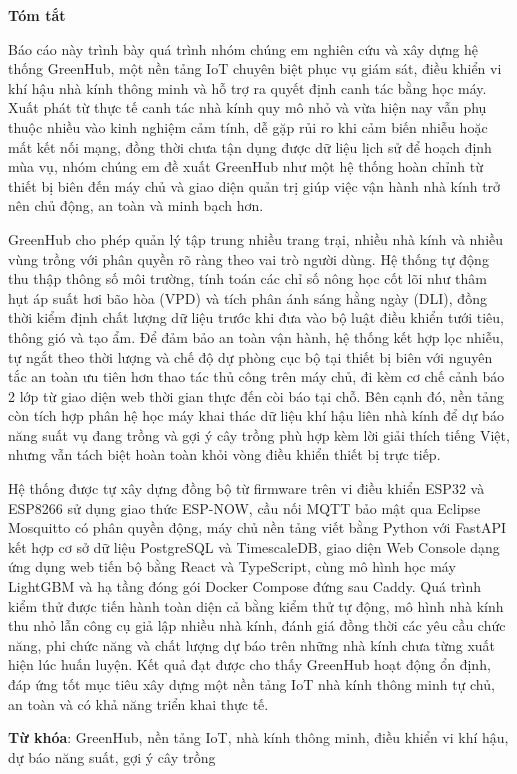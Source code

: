 \begin{center}
\textbf{\large{Tóm tắt}}
\end{center}


\begin{small}

Báo cáo này trình bày quá trình nhóm chúng em nghiên cứu và xây dựng hệ thống GreenHub, một nền tảng IoT chuyên biệt phục vụ giám sát, điều khiển vi khí hậu nhà kính thông minh và hỗ trợ ra quyết định canh tác bằng học máy. Xuất phát từ thực tế canh tác nhà kính quy mô nhỏ và vừa hiện nay vẫn phụ thuộc nhiều vào kinh nghiệm cảm tính, dễ gặp rủi ro khi cảm biến nhiễu hoặc mất kết nối mạng, đồng thời chưa tận dụng được dữ liệu lịch sử để hoạch định mùa vụ, nhóm chúng em đề xuất GreenHub như một hệ thống hoàn chỉnh từ thiết bị biên đến máy chủ và giao diện quản trị giúp việc vận hành nhà kính trở nên chủ động, an toàn và minh bạch hơn.

GreenHub cho phép quản lý tập trung nhiều trang trại, nhiều nhà kính và nhiều vùng trồng với phân quyền rõ ràng theo vai trò người dùng. Hệ thống tự động thu thập thông số môi trường, tính toán các chỉ số nông học cốt lõi như thâm hụt áp suất hơi bão hòa (VPD) và tích phân ánh sáng hằng ngày (DLI), đồng thời kiểm định chất lượng dữ liệu trước khi đưa vào bộ luật điều khiển tưới tiêu, thông gió và tạo ẩm. Để đảm bảo an toàn vận hành, hệ thống kết hợp lọc nhiễu, tự ngắt theo thời lượng và chế độ dự phòng cục bộ tại thiết bị biên với nguyên tắc an toàn ưu tiên hơn thao tác thủ công trên máy chủ, đi kèm cơ chế cảnh báo 2 lớp từ giao diện web thời gian thực đến còi báo tại chỗ. Bên cạnh đó, nền tảng còn tích hợp phân hệ học máy khai thác dữ liệu khí hậu liên nhà kính để dự báo năng suất vụ đang trồng và gợi ý cây trồng phù hợp kèm lời giải thích tiếng Việt, nhưng vẫn tách biệt hoàn toàn khỏi vòng điều khiển thiết bị trực tiếp.

Hệ thống được tự xây dựng đồng bộ từ firmware trên vi điều khiển ESP32 và ESP8266 sử dụng giao thức ESP-NOW, cầu nối MQTT bảo mật qua Eclipse Mosquitto có phân quyền động, máy chủ nền tảng viết bằng Python với FastAPI kết hợp cơ sở dữ liệu PostgreSQL và TimescaleDB, giao diện Web Console dạng ứng dụng web tiến bộ bằng React và TypeScript, cùng mô hình học máy LightGBM và hạ tầng đóng gói Docker Compose đứng sau Caddy. Quá trình kiểm thử được tiến hành toàn diện cả bằng kiểm thử tự động, mô hình nhà kính thu nhỏ lẫn công cụ giả lập nhiều nhà kính, đánh giá đồng thời các yêu cầu chức năng, phi chức năng và chất lượng dự báo trên những nhà kính chưa từng xuất hiện lúc huấn luyện. Kết quả đạt được cho thấy GreenHub hoạt động ổn định, đáp ứng tốt mục tiêu xây dựng một nền tảng IoT nhà kính thông minh tự chủ, an toàn và có khả năng triển khai thực tế.

\vspace*{1cm}
\textbf{Từ khóa}: GreenHub, nền tảng IoT, nhà kính thông minh, điều khiển vi khí hậu, dự báo năng suất, gợi ý cây trồng

\end{small}
